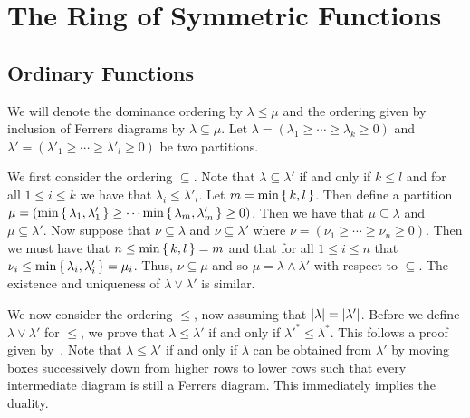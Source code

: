 \documentclass[letterpaper, 11pt, oneside]{book}
\begin{document}
\clearpage

\chapter{\cite{book:Manivel} The Ring of Symmetric Functions}

\section{Ordinary Functions}

\begin{sol}\label{ex:Manivel_1.1.2}
  We will denote the dominance ordering by $\lambda \leq \mu$ and the ordering given by inclusion of Ferrers diagrams by $\lambda \subseteq \mu$.
  Let $\lambda = (\lambda_{1} \geq \cdots \geq \lambda_{k} \geq 0)$ and $\lambda' = (\lambda'_{1} \geq \cdots \geq \lambda'_{l} \geq 0)$ be two partitions.

  We first consider the ordering $\subseteq$.
  Note that $\lambda \subseteq \lambda'$ if and only if $k \leq l$ and for all $1 \leq i \leq k$ we have that $\lambda_{i} \leq \lambda'_{i}$.
  Let $m = \min\set{k, l}$.
  Then define a partition $\mu = (\min\set{\lambda_{1}, \lambda'_{1}} \geq \cdots \min\set{\lambda_{m}, \lambda'_{m}} \geq 0)$.
  Then we have that $\mu \subseteq \lambda$ and $\mu \subseteq \lambda'$.
  Now suppose that $\nu \subseteq \lambda$ and $\nu \subseteq \lambda'$ where $\nu = (\nu_{1} \geq \cdots \geq \nu_{n} \geq 0)$.
  Then we must have that $n \leq \min\set{k, l} = m$ and that for all $1 \leq i \leq n$ that $\nu_{i} \leq \min\set{\lambda_{i}, \lambda'_{i}} = \mu_{i}$.
  Thus, $\nu \subseteq \mu$ and so $\mu = \lambda \land \lambda'$ with respect to $\subseteq$.
  The existence and uniqueness of $\lambda \lor \lambda'$ is similar.

  We now consider the ordering $\leq$, now assuming that $\abs{\lambda} = \abs{\lambda'}$.
  Before we define $\lambda \lor \lambda'$ for $\leq$, we prove that $\lambda \leq \lambda'$ if and only if ${\lambda'}^{*} \leq \lambda^{*}$.
  This follows a proof given by~\cite{SE:dominance_conjugation}.
  Note that $\lambda \leq \lambda'$ if and only if $\lambda$ can be obtained from $\lambda'$ by moving boxes successively down from higher rows to lower rows such that every intermediate diagram is still a Ferrers diagram.
  This immediately implies the duality.


\end{sol}
\end{document}
